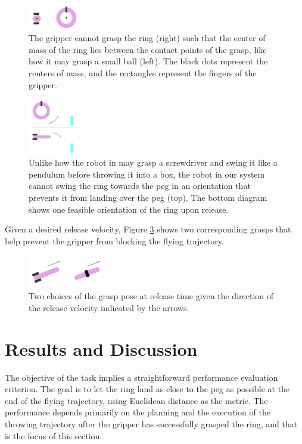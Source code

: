 \documentclass[conference]{IEEEtran}
\begin{document}
\begin{figure}[ht]
\centering
\includegraphics[width=0.2\textwidth]{images/center_of_mass.png}
\caption{The gripper cannot grasp the ring (right) such that the center of mass of the ring lies between the contact points of the grasp, like how it may grasp a small ball (left). The black dots represent the centers of mass, and the rectangles represent the fingers of the gripper.}
\label{fig:center_of_mass}
\end{figure}

\begin{figure}[ht]
\centering
\includegraphics[width=0.2\textwidth]{images/swing.png}
\caption{Unlike how the robot in \cite{zeng2020tossingbot} may grasp a screwdriver and swing it like a pendulum before throwing it into a box, the robot in our system cannot swing the ring towards the peg in an orientation that prevents it from landing over the peg (top). The bottom diagram shows one feasible orientation of the ring upon release.}
\label{fig:swing}
\end{figure}

Given a desired release velocity, Figure \ref{fig:grasp_direction} shows two corresponding grasps that help prevent the gripper from blocking the flying trajectory.
\begin{figure}[ht]
\centering
\includegraphics[width=0.3\textwidth]{grasp_direction.png}
\caption{Two choices of the grasp pose at release time given the direction of the release velocity indicated by the arrows.}
\label{fig:grasp_direction}
\end{figure}


\section{Results and Discussion}
\label{results}
The objective of the task implies a straightforward performance evaluation criterion. The goal is to let the ring land as close to the peg as possible at the end of the flying trajectory, using Euclidean distance as the metric. The performance depends primarily on the planning and the execution of the throwing trajectory after the gripper has successfully grasped the ring, and that is the focus of this section.
\end{document}
